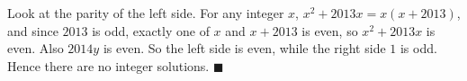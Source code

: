 Look at the parity of the left side. For any integer $x$, $x^2+2013x=x(x+2013)$, and since $2013$ is odd, exactly one of $x$ and $x+2013$ is even, so $x^2+2013x$ is even. Also $2014y$ is even. So the left side is even, while the right side $1$ is odd. Hence there are no integer solutions. $\blacksquare$
